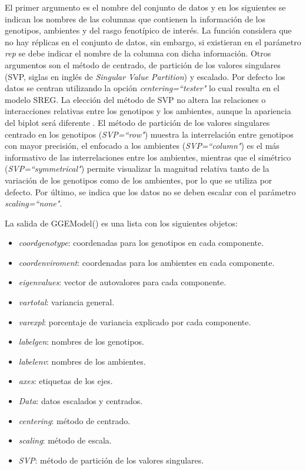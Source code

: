 El primer argumento es el nombre del conjunto de datos y en los siguientes se indican los nombres de las columnas que contienen la información de los genotipos, ambientes y del rasgo fenotípico de interés. La función considera que no hay réplicas en el conjunto de datos, sin embargo, si existieran en el parámetro \emph{rep} se debe indicar el nombre de la columna con dicha información. Otros argumentos son el método de centrado, de partición de los valores singulares (SVP, siglas en inglés de \emph{Singular Value Partition}) y escalado. Por defecto los datos se centran utilizando la opción \emph{centering=``tester"} lo cual resulta en el modelo SREG. La elección del método de SVP no altera las relaciones o interacciones relativas entre los genotipos y los ambientes, aunque la apariencia del biplot será diferente \citep{Yan2002}. El método de partición de los valores singulares centrado en los genotipos (\emph{SVP=``row"}) muestra la interrelación entre genotipos con mayor precisión, el enfocado a los ambientes (\emph{SVP=``column"}) es el más informativo de las interrelaciones entre los ambientes, mientras que el simétrico (\emph{SVP=``symmetrical"}) permite visualizar la magnitud relativa tanto de la variación de los genotipos como de los ambientes, por lo que se utiliza por defecto. Por último, se indica que los datos no se deben escalar con el parámetro \emph{scaling=``none"}. 

La salida de \textcolor{fandango}{GGEModel()} es una lista con los siguientes objetos:
\begin{itemize}
\item \emph{coordgenotype}: coordenadas para los genotipos en cada componente.
\item \emph{coordenviroment}: coordenadas para los ambientes en cada componente.
\item \emph{eigenvalues}: vector de autovalores para cada componente.
\item \emph{vartotal}: variancia general.
\item \emph{varexpl}: porcentaje de variancia explicado por cada componente.
\item \emph{labelgen}: nombres de los genotipos.
\item \emph{labelenv}: nombres de los ambientes.
\item \emph{axes}: etiquetas de los ejes.
\item \emph{Data}: datos escalados y centrados.
\item \emph{centering}: método de centrado.
\item \emph{scaling}: método de escala.
\item \emph{SVP}: método de partición de los valores singulares. 
\end{itemize}


